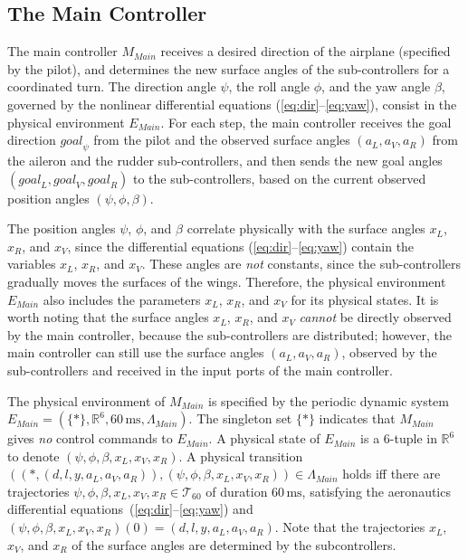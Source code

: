 \documentclass{sig-alternate}
\begin{document}
\subsection{The Main Controller}

The main controller $M_\mathit{Main}$ receives 
a desired direction of the airplane (specified by the pilot),
and determines the new surface angles of the sub-controllers
for a coordinated turn. 
%
The direction angle $\psi$, the roll angle $\phi$, and the yaw angle $\beta$,
governed by the nonlinear differential equations (\ref{eq:dir}--\ref{eq:yaw}),
consist in the physical environment $E_\mathit{Main}$.
For each step, the main controller receives the goal direction
$\mathit{goal}_\psi$ from the pilot 
and the observed surface angles $(a_L, a_V, a_R)$
from the aileron and the rudder sub-controllers,
and then sends the new goal angles 
$(\mathit{goal}_L, \mathit{goal}_V, \mathit{goal}_R)$ to the sub-controllers,
based on the current observed position angles $(\psi, \phi, \beta)$.


The position angles $\psi$, $\phi$, and $\beta$ correlate
physically with the surface angles $x_L$, $x_R$, and $x_V$,
since the differential equations (\ref{eq:dir}--\ref{eq:yaw}) contain 
the variables $x_L$, $x_R$, and $x_V$.
These angles are \emph{not} constants,
since the sub-controllers gradually  moves the surfaces of the wings.
Therefore, the physical environment $E_\mathit{Main}$
also includes the parameters $x_L$, $x_R$, and $x_V$
for its physical states.
It is worth noting that the surface angles $x_L$, $x_R$, and $x_V$
\emph{cannot} be directly observed by the main controller, 
because the sub-controllers are distributed;
however, the main controller can still use the surface angles $(a_L, a_V, a_R)$,
observed by the sub-controllers and received in the input ports of the main controller.
 
The physical environment of $M_\mathit{Main}$
is specified by the periodic dynamic system
$E_\mathit{Main} = (\{\ast\}, \mathbb{R}^6, 60\,\mathrm{ms}, \Lambda_{\mathit{Main}})$.
The singleton set $\{\ast\}$ indicates 
that $M_\mathit{Main}$ gives \emph{no} control commands to $E_\mathit{Main}$.
A physical state of $E_\mathit{Main}$
is a $6$-tuple in $\mathbb{R}^6$ 
to denote $(\psi,  \phi, \beta, x_L, x_V, x_R)$.
A physical transition
$((\ast, (d,  l, y, a_L, a_V, a_R)), (\psi,  \phi, \beta, x_L, x_V, x_R)) \in \Lambda_{\mathit{Main}}$
holds
iff there are trajectories $\psi,  \phi, \beta, x_L, x_V, x_R \in \mathcal{T}_{60}$
of duration $60\,\mathrm{ms}$,
satisfying the aeronautics differential equations~(\ref{eq:dir}--\ref{eq:yaw})
and $(\psi,  \phi, \beta, x_L, x_V, x_R)(0) = (d,  l, y, a_L, a_V, a_R)$.
Note that 
the trajectories $x_L$, $x_V$, and $x_R$ of the surface angles 
are determined by the subcontrollers.
\end{document}
